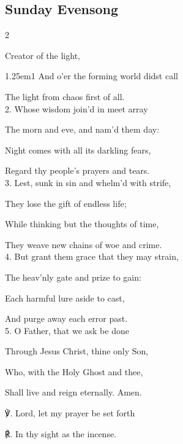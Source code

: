 \subsection{Sunday Evensong}\label{SundayEvensong}

\begin{multicols}{2}
\sloppy

 Creator of the light,


\begin{hangparas}{1.25em}{1}
And o'er the forming world didst call

The light from chaos first of all.\\

2. Whose wisdom join'd in meet array

The morn and eve, and nam'd them day:

Night comes with all its darkling fears,

Regard thy people's prayers and tears.\\

3. Lest, sunk in sin and whelm'd with strife,

They lose the gift of endless life;

While thinking but the thoughts of time,

They weave new chains of woe and crime.\\

4. But grant them grace that they may strain,

The heav'nly gate and prize to gain:

Each harmful lure aside to cast,

And purge away each error past.\\

5. O Father, that we ask be done

Through Jesus Christ, thine only Son,

Who, with the Holy Ghost and thee,

Shall live and reign eternally. Amen.\\
\end{hangparas}

℣. Lord, let my prayer be set forth

℟. In thy sight as the incense.

\fussy
\end{multicols}


\clearpage
{}


